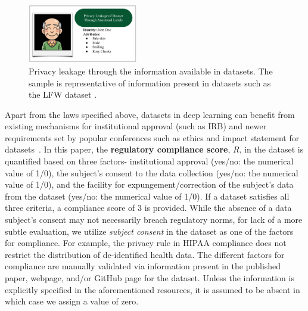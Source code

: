 \documentclass[journal]{IEEEtran}
\begin{document}
\begin{figure}[t]
\centering
\includegraphics[width=0.43\textwidth]{images/PrivacyQuantification.pdf}
\caption{Privacy leakage through the information available in datasets. The sample is representative of information present in datasets such as the LFW dataset \cite{huang2008labeled, liu2015deep}.}
\label{fig:privacy}
\end{figure}

Apart from the laws specified above, datasets in deep learning can benefit from existing mechanisms for institutional approval (such as IRB) and newer requirements set by popular conferences such as ethics and impact statement for datasets~\cite{EthicsCVPR}. In this paper, the \textbf{regulatory compliance score}, $R$,  in the dataset is quantified based on three factors- institutional approval (yes/no: the numerical value of 1/0), the subject's consent to the data collection (yes/no: the numerical value of 1/0), and the facility for expungement/correction of the subject's data from the dataset (yes/no: the numerical value of 1/0). If a dataset satisfies all three criteria, a compliance score of $3$ is provided. While the absence of a data subject's consent may not necessarily breach regulatory norms, for lack of a more subtle evaluation, we utilize \textit{subject consent} in the dataset as one of the factors for compliance. For example, the privacy rule in HIPAA compliance does not restrict the distribution of de-identified health data. The different factors for compliance are manually validated via information present in the published paper, webpage, and/or GitHub page for the dataset. Unless the information is explicitly specified in the aforementioned resources, it is assumed to be absent in which case we assign a value of zero. 
\end{document}
